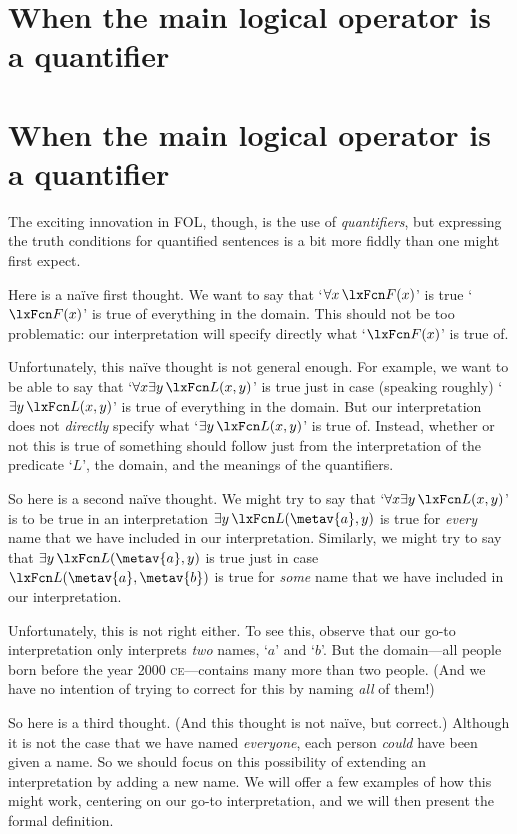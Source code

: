 \ifHTMLtarget
\section{When the main logical operator is a quantifier}
\else
\section[Quantifiers]{When the main logical operator is a quantifier}
\fi
\label{s:MainLogicalOperatorQuantifier}

The exciting innovation in FOL, though, is the use of \emph{quantifiers}, but expressing the truth conditions for quantified sentences is a bit more fiddly than one might first expect.

Here is a na\"{i}ve first thought. We want to say that `$\forall x\, \atom{F}{x}$' is true \ifeff{} `$\atom{F}{x}$' is true of everything in the domain. This should not be too problematic: our interpretation will specify directly what `$\atom{F}{x}$' is true of.

Unfortunately, this na\"{i}ve thought is not general enough. For example, we want to be able to say that `$\forall x \exists y\, \atom{L}{x,y}$' is true just in case (speaking roughly) `$\exists y\, \atom{L}{x,y}$' is true of everything in the domain. But our interpretation does not \emph{directly} specify what `$\exists y\, \atom{L}{x,y}$' is true of. Instead, whether or not this is true of something should follow just from the interpretation of the predicate `$L$', the domain, and the meanings of the quantifiers.

So here is a second na\"{i}ve thought. We might try to say that `$\forall x \exists y\, \atom{L}{x,y}$' is to be true in an interpretation \ifeff{} $\exists y\, \atom{L}{\metav{a},y}$ is true for \emph{every} name  that we have included in our interpretation. Similarly, we might try to say that $\exists y\, \atom{L}{\metav{a},y}$ is true just in case $\atom{L}{\metav{a},\metav{b}}$ is true for \emph{some} name  that we have included in our interpretation.

Unfortunately, this is not right either. To see this, observe that our go-to interpretation only interprets \emph{two} names, `$a$' and `$b$'. But the domain---all people born before the year 2000 \textsc{ce}---contains many more than two people. (And we have no intention of trying to correct for this by naming \emph{all} of them!)

So here is a third thought. (And this thought is not na\"{i}ve, but correct.) Although it is not the case that we have named \emph{everyone}, each person \emph{could} have been given a name. So we should focus on this possibility of extending an interpretation by adding a new name. We will offer a few examples of how this might work, centering on our go-to interpretation, and we will then present the formal definition.

